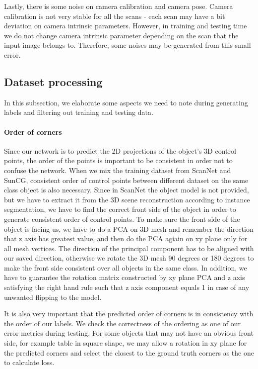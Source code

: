 Lastly, there is some noise on camera calibration and camera pose. Camera calibration is not very stable for all the scans - each scan may have a bit deviation on camera intrinsic parameters. However, in training and testing time we do not change camera intrinsic parameter depending on the scan that the input image belongs to. Therefore, some noises may be generated from this small error.
 
\subsection{Dataset processing}

In this subsection, we elaborate some aspects we need to note during generating labels and filtering out training and testing data.

\paragraph{Order of corners}
Since our network is to predict the 2D projections of the object's 3D control points, the order of the points is important to be consistent in order not to confuse the network. When we mix the training dataset from ScanNet and SunCG, consistent order of control points between different dataset on the same class object is also necessary. Since in ScanNet the object model is not provided, but we have to extract it from the 3D scene reconstruction according to instance segmentation, we have to find the correct front side of the object in order to generate consistent order of control points. To make sure the front side of the object is facing us, we have to do a PCA on 3D mesh and remember the direction that z axis has greatest value, and then do the PCA agiain on xy plane only for all mesh vertices. The direction of the principal component has to be aligned with our saved direction, otherwise we rotate the 3D mesh 90 degrees or 180 degrees to make the front side consistent over all objects in the same class. In addition, we have to guarantee the rotation matrix constructed by xy plane PCA and z axis satisfying the right hand rule such that z axis component equals 1 in case of any unwanted flipping to the model.

It is also very important that the predicted order of corners is in consistency with the order of our labels. We check the correctness of the ordering as one of our error metrics during testing. For some objects that may not have an obvious front side, for example table in square shape, we may allow a rotation in xy plane for the predicted corners and select the closest to the ground truth corners as the one to calculate loss.

